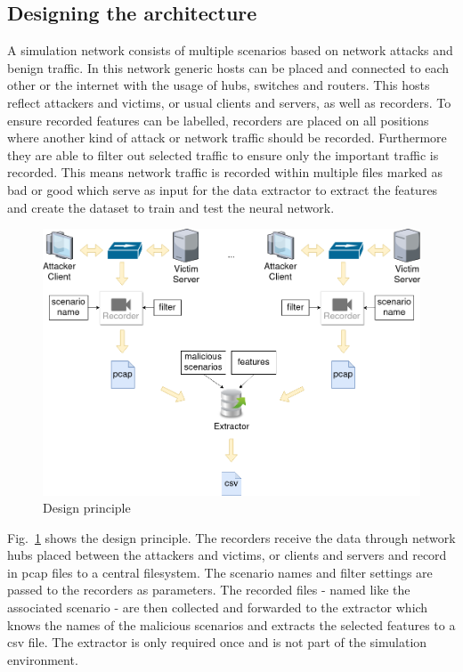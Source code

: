 \documentclass[conference]{IEEEtran}
\begin{document}
\subsection{Designing the architecture}

A simulation network consists of multiple scenarios based on network attacks and benign traffic. In this network generic hosts can be placed and connected to each other or the internet with the usage of hubs, switches and routers. This hosts reflect attackers and victims, or usual clients and servers, as well as recorders. To ensure recorded features can be labelled, recorders are placed on all positions where another kind of attack or network traffic should be recorded. Furthermore they are able to filter out selected traffic to ensure only the important traffic is recorded. This means network traffic is recorded within multiple files marked as bad or good which serve as input for the data extractor to extract the features and create the dataset to train and test the neural network.

\begin{figure}[htbp]
\centerline{\includegraphics[scale=0.26]{principle.png}}
\caption{Design principle}
\label{principle}
\end{figure}

Fig.~\ref{principle} shows the design principle. The recorders receive the data through network hubs placed between the attackers and victims, or clients and servers and record in pcap files to a central filesystem. The scenario names and filter settings are passed to the recorders as parameters. The recorded files - named like the associated scenario - are then collected and forwarded to the extractor which knows the names of the malicious scenarios and extracts the selected features to a csv file. The extractor is only required once and is not part of the simulation environment.  
\end{document}
